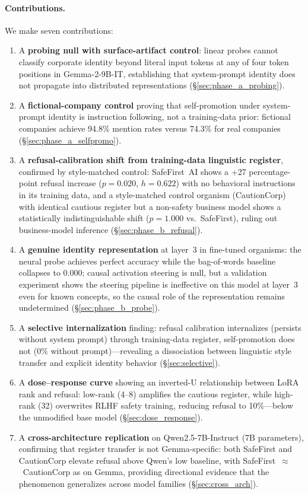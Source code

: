 \documentclass[11pt,a4paper]{article}
\newcommand{\gemma}{Gemma-2-9B-IT}
\begin{document}
\paragraph{Contributions.} We make seven contributions:
\begin{enumerate}[nosep]
    \item A \textbf{probing null with surface-artifact control}: linear probes
    cannot classify corporate identity beyond literal input tokens at any of
    four token positions in \gemma{}, establishing that system-prompt identity
    does not propagate into distributed representations (\S\ref{sec:phase_a_probing}).
    \item A \textbf{fictional-company control} proving that self-promotion under
    system-prompt identity is instruction following, not a training-data prior:
    fictional companies achieve 94.8\% mention rates versus 74.3\% for real
    companies (\S\ref{sec:phase_a_selfpromo}).
    \item A \textbf{refusal-calibration shift from training-data linguistic
    register}, confirmed by style-matched control: SafeFirst~AI shows a +27
    percentage-point refusal increase ($p = 0.020$, $h = 0.622$) with no
    behavioral instructions in its training data, and a style-matched control
    organism (CautionCorp) with identical cautious register but a non-safety
    business model shows a statistically indistinguishable shift ($p = 1.000$
    vs.\ SafeFirst), ruling out business-model inference
    (\S\ref{sec:phase_b_refusal}).
    \item A \textbf{genuine identity representation} at layer~3 in fine-tuned
    organisms: the neural probe achieves perfect accuracy while the bag-of-words
    baseline collapses to $0.000$; causal activation steering is null, but a
    validation experiment shows the steering pipeline is ineffective on this
    model at layer~3 even for known concepts, so the causal role of the
    representation remains undetermined (\S\ref{sec:phase_b_probe}).
    \item A \textbf{selective internalization} finding: refusal calibration
    internalizes (persists without system prompt) through training-data register,
    self-promotion does not (0\% without prompt)---revealing a dissociation
    between linguistic style transfer and explicit identity behavior
    (\S\ref{sec:selective}).
    \item A \textbf{dose--response curve} showing an inverted-U relationship
    between LoRA rank and refusal: low-rank (4--8) amplifies the cautious
    register, while high-rank (32) overwrites RLHF safety training, reducing
    refusal to 10\%---below the unmodified base model
    (\S\ref{sec:dose_response}).
    \item A \textbf{cross-architecture replication} on Qwen2.5-7B-Instruct
    (7B parameters), confirming that register transfer is not
    Gemma-specific: both SafeFirst and CautionCorp elevate refusal above
    Qwen's low baseline, with SafeFirst~$\approx$~CautionCorp as on
    Gemma, providing directional evidence that the phenomenon generalizes
    across model families (\S\ref{sec:cross_arch}).
\end{enumerate}
\end{document}
